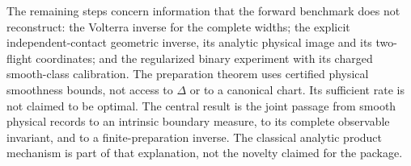 The remaining steps concern information that the forward benchmark
does not reconstruct: the Volterra inverse for the complete widths;
the explicit independent-contact geometric inverse, its analytic
physical image and its two-flight coordinates; and the regularized
binary experiment with its charged smooth-class calibration.
The preparation theorem uses certified physical smoothness bounds,
not access to $\Delta$ or to a canonical chart. Its sufficient rate
is not claimed to be optimal. The central result is the joint passage
from smooth physical records to an intrinsic boundary measure, to its
complete observable invariant, and to a finite-preparation inverse.
The classical analytic product mechanism is part of that explanation,
not the novelty claimed for the package.
